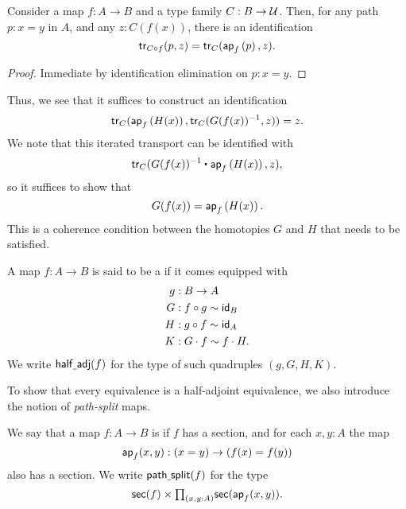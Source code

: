 \begin{lem}
Consider a map $f:A\to B$ and a type family $C:B\to \UU$. Then, for any path $p:x=y$ in $A$, and any $z:C(f(x))$, there is an identification
\begin{equation*}
\mathsf{tr}_{C\circ f}(p,z)=\mathsf{tr}_C(\ap{f}{p},z).
\end{equation*}
\end{lem}

\begin{proof}
Immediate by identification elimination on $p:x=y$.
\end{proof}

Thus, we see that it suffices to construct an identification
\begin{equation*}
\mathsf{tr}_{C}(\ap{f}{H(x)},\mathsf{tr}_C(G(f(x))^{-1},z))=z.
\end{equation*}
We note that this iterated transport can be identified with
\begin{equation*}
\mathsf{tr}_C(\ct{G(f(x))^{-1}}{\ap{f}{H(x)}},z),
\end{equation*}
so it suffices to show that 
\begin{equation*}
G(f(x)) = \ap{f}{H(x)}.
\end{equation*}
This is a coherence condition between the homotopies $G$ and $H$ that needs to be satisfied.

\begin{defn}
A map $f:A\to B$ is said to be a  if it comes equipped with
\begin{align*}
g & : B \to A\\
G & : f\circ g \htpy \idfunc[B] \\
H & : g\circ f \htpy \idfunc[A] \\
K & : G\cdot f \htpy f\cdot H.
\end{align*}
We write $\mathsf{half\usc{}adj}(f)$ for the type of such quadruples $(g,G,H,K)$.
\end{defn}

To show that every equivalence is a half-adjoint equivalence, we also introduce the notion of \emph{path-split} maps.

\begin{defn}
We say that a map $f:A\to B$ is  if $f$ has a section, and for each $x,y:A$ the map
\begin{equation*}
\apfunc{f}(x,y):(x=y)\to (f(x)=f(y))
\end{equation*}
also has a section. We write $\mathsf{path\usc{}split}(f)$ for the type
\begin{equation*}
\mathsf{sec}(f)\times\prd{x,y:A}\mathsf{sec}(\apfunc{f}(x,y)).
\end{equation*}
\end{defn}

